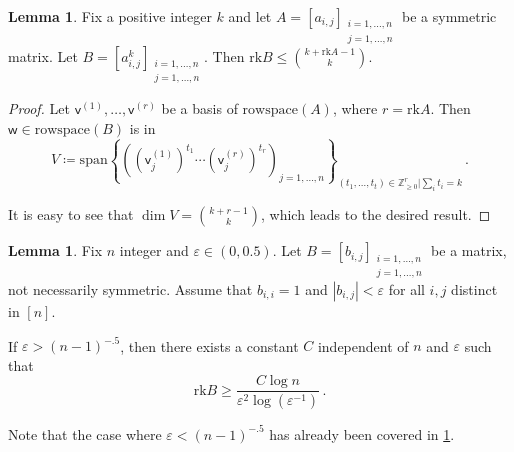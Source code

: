 \documentclass[12pt]{amsart}
\theoremstyle{definition}
\newtheorem{lm}[thm]{Lemma}
\newcommand{\Z}{\mathbb{Z}}
\newcommand{\vv}{\mathsf{v}}
\newcommand{\vw}{\mathsf{w}}
\newcommand{\spn}{\mathrm{span}}
\newcommand{\rk}{\mathrm{rk}}
\begin{document}
\begin{lm}\label{lm:JL_2}
Fix a positive integer $k$ and let $A = [a_{i, j}]_{\substack{i = 1, \ldots , n \\ j = 1, \ldots , n}}$ be a symmetric matrix.
Let $B = [a_{i, j}^k]_{\substack{i = 1, \ldots , n \\ j = 1, \ldots , n}}$.
Then $\rk B \leq \binom{k + \rk A - 1}{k}$.
\end{lm}

\begin{proof}
Let $\vv^{(1)}, \ldots, \vv^{(r)} $ be a basis of $\mathrm{rowspace}(A)$, where $r = \rk A$.
Then $\vw \in \mathrm{rowspace}(B)$ is in 
$$V \coloneqq \spn \left\{ \left((\vv_j^{(1)})^{t_1} \cdots (\vv_j^{(r)})^{t_r} \right)_{j = 1, \ldots, n}\right\}_{(t_1, \ldots , t_t) \in \Z_{\geq 0}^r | \sum_i t_i = k } \, .$$

It is easy to see that $\dim V = \binom{k + r - 1}{k}$, which leads to the desired result.
\end{proof}

\begin{lm}\label{lm:JL_3}
Fix $n$ integer and $\varepsilon \in (0, 0.5)$.
Let $B = [b_{i, j}]_{\substack{i = 1, \ldots , n \\ j = 1, \ldots , n}}$ be a matrix, not necessarily symmetric.
Assume that $b_{i, i} = 1$ and $|b_{i, j}| < \varepsilon $ for all $i, j$ distinct in $[n]$.

If $\varepsilon > (n-1)^{-.5}$, then there exists a constant $C$ independent of $n$ and $\varepsilon$ such that 
$$ \rk B \geq \frac{C \log n}{\varepsilon^2 \log (\varepsilon^{-1})}\, . $$
\end{lm}

Note that the case where $\varepsilon < (n-1)^{-.5}$ has already been covered in \cref{lm:JL_3}.
\end{document}
